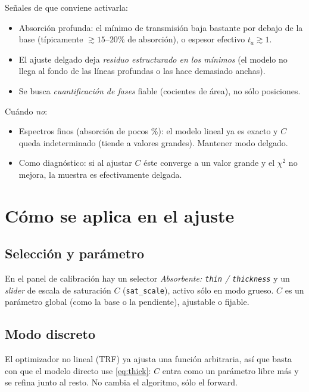 \documentclass[11pt,a4paper]{article}
\newcommand{\code}[1]{\texttt{\small #1}}
\begin{document}
Señales de que conviene activarla:
\begin{itemize}[leftmargin=*]
  \item Absorción profunda: el mínimo de transmisión baja bastante por debajo de
        la base (típicamente $\gtrsim 15$–$20\%$ de absorción), o espesor efectivo
        $t_a\gtrsim 1$.
  \item El ajuste delgado deja \emph{residuo estructurado en los mínimos} (el
        modelo no llega al fondo de las líneas profundas o las hace demasiado
        anchas).
  \item Se busca \emph{cuantificación de fases} fiable (cocientes de área), no
        sólo posiciones.
\end{itemize}
Cuándo \emph{no}:
\begin{itemize}[leftmargin=*]
  \item Espectros finos (absorción de pocos \%): el modelo lineal ya es exacto y
        $C$ queda indeterminado (tiende a valores grandes). Mantener modo delgado.
  \item Como diagnóstico: si al ajustar $C$ éste converge a un valor grande y el
        $\chi^2$ no mejora, la muestra es efectivamente delgada.
\end{itemize}

\section{Cómo se aplica en el ajuste}

\subsection{Selección y parámetro}
En el panel de calibración hay un selector \emph{Absorbente: \code{thin} /
\code{thickness}} y un \emph{slider} de escala de saturación $C$
(\code{sat\_scale}), activo sólo en modo grueso. $C$ es un parámetro global
(como la base o la pendiente), ajustable o fijable.

\subsection{Modo discreto}
El optimizador no lineal (TRF) ya ajusta una función arbitraria, así que basta
con que el modelo directo use \eqref{eq:thick}: $C$ entra como un parámetro libre
más y se refina junto al resto. No cambia el algoritmo, sólo el forward.
\end{document}
